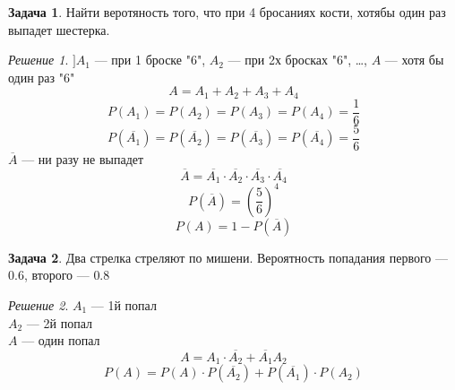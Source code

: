 \documentclass[english]{article}
\theoremstyle{plain}
\theoremstyle{remark}
\newtheorem*{solution}{Решение}
\theoremstyle{definition}
\newtheorem{task}{Задача}
\begin{document}
\begin{task}
Найти веротяность того, что при 4 бросаниях кости, хотябы один раз выпадет шестерка.
\end{task}
\begin{solution}
\(] A_1\) --- при 1 броске "6", \(A_2\) --- при 2х бросках "6", \dots{}, \(A\) --- хотя бы один раз "6"
\[ A = A_1 + A_2 + A_3 + A_4 \]
\[ P(A_1) = P(A_2) = P(A_3) = P(A_4) = \frac{1}{6} \]
\[ P(\overline{A_1}) = P(\overline{A_2}) = P(\overline{A_3}) = P(\overline{A_4}) = \frac{5}{6} \]
\(\overline{A}\) --- ни разу не выпадет
\[ \overline{A} = \overline{A_1}\cdot\overline{A_2}\cdot\overline{A_3}\cdot\overline{A_4} \]
\[ P(\overline{A}) = \left(\frac{5}{6}\right)^4  \]
\[ P(A) = 1 - P(\overline{A}) \]
\end{solution}
\begin{task}
Два стрелка стреляют по мишени. Вероятность попадания первого --- \(0.6\), второго --- \(0.8\)
\end{task}
\begin{solution}
\(A_1\) --- 1й попал \\
\(A_2\) --- 2й попал \\
\(A\) --- один попал
\[ A = A_1\cdot\overline{A_2} + \overline{A_1}A_2 \]
\[ P(A)  = P(A)\cdot P(\overline{A_2}) + P(\overline{A_1})\cdot P(A_2) \]
\end{solution}
\end{document}
